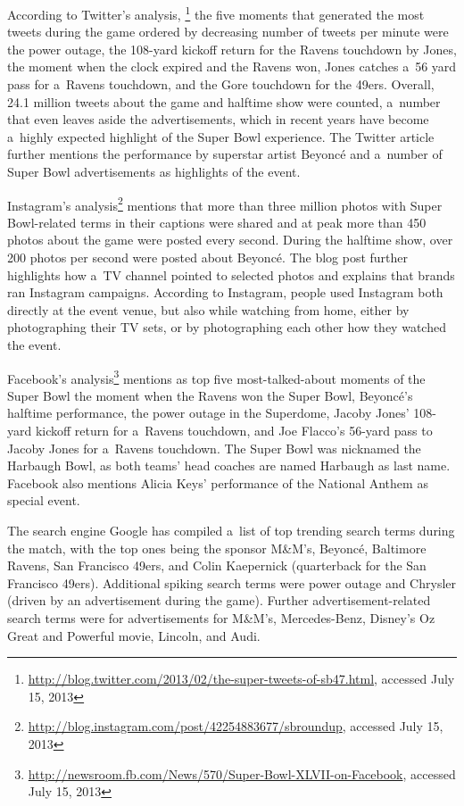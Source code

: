 According to Twitter's analysis,%
\footnote{\url{http://blog.twitter.com/2013/02/the-super-tweets-of-sb47.html},
accessed July 15, 2013}
the five moments that generated the most tweets
during the game ordered by decreasing number of tweets per minute were
the power outage,
the 108-yard kickoff return for the Ravens touchdown by Jones,
the moment when the clock expired and the Ravens won,
Jones catches a~56 yard pass for a~Ravens touchdown,
and the Gore touchdown for the 49ers.
Overall, 24.1 million tweets about the game and halftime show were counted,
a~number that even leaves aside the advertisements,
which in recent years have become a~highly expected highlight
of the Super Bowl experience.
The Twitter article further mentions the performance by superstar artist Beyoncé 
and a~number of Super Bowl advertisements as highlights of the event.   

Instagram's analysis\footnote{\url{http://blog.instagram.com/post/42254883677/sbroundup},
accessed July 15, 2013}
mentions that more than three million photos
with Super Bowl-related terms in their captions were shared and
at peak more than 450 photos about the game were posted every second.
During the halftime show, over 200 photos per second were posted about Beyoncé.
The blog post further highlights how a~TV channel pointed to selected photos
and explains that brands ran Instagram campaigns.
According to Instagram, people used Instagram both directly at the event venue,
but also while watching from home, either by photographing their TV sets,
or by photographing each other how they watched the event.

Facebook's analysis\footnote{\url{http://newsroom.fb.com/News/570/Super-Bowl-XLVII-on-Facebook},
accessed July 15, 2013}
mentions as top five most-talked-about moments of the Super Bowl 
the moment when the Ravens won the Super Bowl, 
Beyoncé's halftime performance,
the power outage in the Superdome,
Jacoby Jones' 108-yard kickoff return for a~Ravens touchdown, and
Joe Flacco’s 56-yard pass to Jacoby Jones for a~Ravens touchdown.
The Super Bowl was nicknamed the Harbaugh Bowl, as both teams' head coaches
are named Harbaugh as last name.
Facebook also mentions Alicia Keys' performance of the National Anthem as special event.

The search engine Google has compiled a~list of top trending search terms
during the match, with the top ones being the sponsor M\&M's, Beyoncé, Baltimore Ravens,
San Francisco 49ers, and Colin Kaepernick (quarterback for the San Francisco 49ers).
Additional spiking search terms were power outage
and Chrysler (driven by an advertisement during the game).
Further advertisement-related search terms were for advertisements for M\&M's,
Mercedes-Benz, Disney’s Oz Great and Powerful movie, Lincoln, and Audi.

